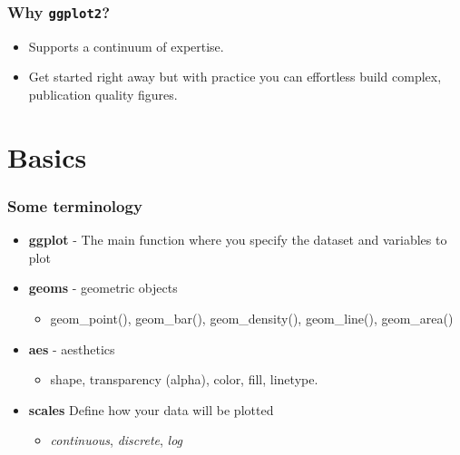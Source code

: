 \documentclass{beamer}\usepackage[]{graphicx}\usepackage[]{color}
\begin{document}

\begin{frame}[fragile]
\frametitle{Why \texttt{ggplot2}?}
\begin{itemize}
\item  Supports a continuum of expertise.
\item Get started right away but with practice you can effortless build complex, publication quality figures.
\end{itemize}
\end{frame}


\section*{Basics}
\frame{\sectionpage}


\begin{frame}[fragile]
\frametitle{Some terminology}
\begin{itemize}
\item \textbf{ggplot} - The main function where you specify the dataset and variables to plot\\
\item \textbf{geoms} - geometric objects
    \begin{itemize}
    \item geom\_point(), geom\_bar(), geom\_density(), geom\_line(), geom\_area()
    \end{itemize}
\item \textbf{aes} -  aesthetics
        \begin{itemize}
    \item shape, transparency (alpha), color, fill, linetype.
    \end{itemize}
\item \textbf{scales}  Define how your data will be plotted
        \begin{itemize}
    \item \emph{continuous}, \emph{discrete}, \emph{log}
    \end{itemize}
\end{itemize}
\end{frame}
\end{document}
